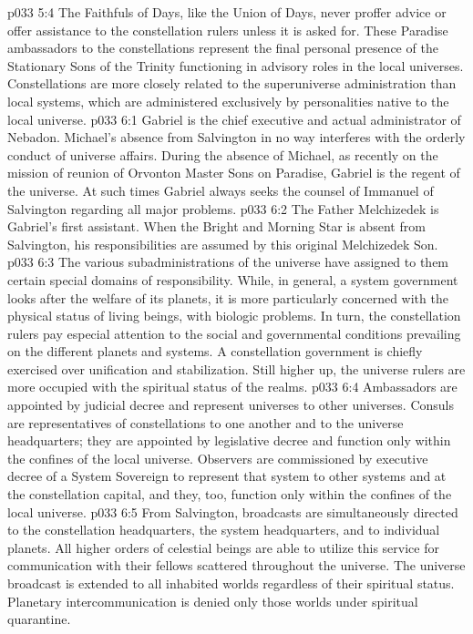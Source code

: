 \vs p033 5:4 The Faithfuls of Days, like the Union of Days, never proffer advice or offer assistance to the constellation rulers unless it is asked for. These Paradise ambassadors to the constellations represent the final personal presence of the Stationary Sons of the Trinity functioning in advisory roles in the local universes. Constellations are more closely related to the superuniverse administration than local systems, which are administered exclusively by personalities native to the local universe.
\vs p033 6:1 Gabriel is the chief executive and actual administrator of Nebadon. Michael’s absence from Salvington in no way interferes with the orderly conduct of universe affairs. During the absence of Michael, as recently on the mission of reunion of Orvonton Master Sons on Paradise, Gabriel is the regent of the universe. At such times Gabriel always seeks the counsel of Immanuel of Salvington regarding all major problems.
\vs p033 6:2 The Father Melchizedek is Gabriel’s first assistant. When the Bright and Morning Star is absent from Salvington, his responsibilities are assumed by this original Melchizedek Son.
\pc \vs p033 6:3 The various subadministrations of the universe have assigned to them certain special domains of responsibility. While, in general, a system government looks after the welfare of its planets, it is more particularly concerned with the physical status of living beings, with biologic problems. In turn, the constellation rulers pay especial attention to the social and governmental conditions prevailing on the different planets and systems. A constellation government is chiefly exercised over unification and stabilization. Still higher up, the universe rulers are more occupied with the spiritual status of the realms.
\pc \vs p033 6:4 Ambassadors are appointed by judicial decree and represent universes to other universes. Consuls are representatives of constellations to one another and to the universe headquarters; they are appointed by legislative decree and function only within the confines of the local universe. Observers are commissioned by executive decree of a System Sovereign to represent that system to other systems and at the constellation capital, and they, too, function only within the confines of the local universe.
\pc \vs p033 6:5 From Salvington, broadcasts are simultaneously directed to the constellation headquarters, the system headquarters, and to individual planets. All higher orders of celestial beings are able to utilize this service for communication with their fellows scattered throughout the universe. The universe broadcast is extended to all inhabited worlds regardless of their spiritual status. Planetary intercommunication is denied only those worlds under spiritual quarantine.
